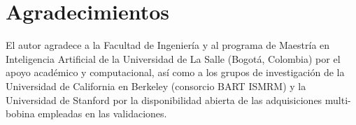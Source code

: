 \documentclass[9pt]{article}
\begin{document}
\section*{Agradecimientos}
El autor agradece a la Facultad de Ingeniería y al programa de Maestría en Inteligencia Artificial de la Universidad de La Salle (Bogotá, Colombia) por el apoyo académico y computacional, así como a los grupos de investigación de la Universidad de California en Berkeley (consorcio BART ISMRM) y la Universidad de Stanford por la disponibilidad abierta de las adquisiciones multi-bobina empleadas en las validaciones.

\printbibliography
\end{document}
